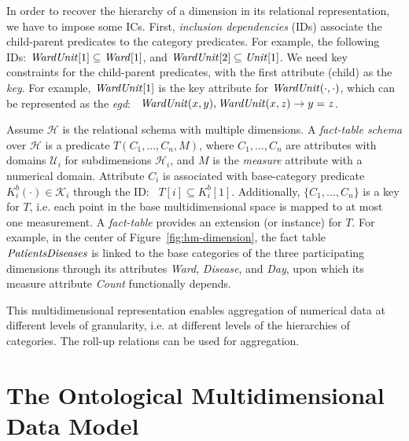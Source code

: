 \documentclass[format=acmsmall, review=false, screen=true]{acmart}
\newcommand{\ignore}[1]{}
\newcommand{\mc}[1]{\mathcal{ #1}}
\newcommand{\nit}[1]{{\it #1}}
\newcommand{\idep}{ID}
\newcommand{\ideps}{IDs}
\newcommand{\egd}{{\em egd}}
\newcommand{\red}[1]{{#1}}
\begin{document}
In order to recover the hierarchy of a dimension in its relational representation, we have to impose some ICs. First, {\em inclusion dependencies} (\ideps) associate the child-parent predicates to the category predicates. For example, the following \ideps:  $\nit{WardUnit}[1] \subseteq \nit{Ward}[1]$, and
$\nit{WardUnit}[2] \subseteq \nit{Unit}[1]$. We need key constraints for the child-parent predicates, with the first attribute (child) as the {\em key}. For example, $\nit{WardUnit}[1]$ is the key attribute for $\nit{WardUnit}(\cdot,\cdot)$, which can be represented as the \egd: \
$\nit{WardUnit}(x,y), \nit{WardUnit}(x,z) \rightarrow y = z$.




\ignore{We can have multiple dimensions reflected with disjoint relational dimensional schemas, one for each dimension. They can be put together into a single multidimensional schema that is the union of the individual ones. In particular, there are now top and base categories predicates in $\mc{K}$, for each dimension. }

Assume $\mc{H}$ is the relational schema with multiple dimensions. A {\em fact-table schema} over $\mc{H}$ is a predicate $T(C_1,...,C_n,M)$, where $C_1,...,C_n$ are attributes with domains $\mc{U}_i$ for subdimensions $\mc{H}_i$, and $M$ is the {\em measure} attribute with a numerical domain. Attribute $C_i$ is associated with base-category predicate $K^b_i(\cdot) \in \mc{K}_i$ through the \idep: \ $T[i] \subseteq K^b_i[1]$. Additionally, $\{C_1,...,C_n\}$ is a key for $T$, i.e. each point in the base multidimensional space is mapped to at most one measurement. A {\em fact-table} provides an extension (or instance) for $T$. For example, \red{in the center of Figure~\ref{fig:hm-dimension}, the fact table $\nit{PatientsDiseases}$ is linked to the base categories of the three participating dimensions through its attributes \nit{Ward}, \nit{Disease}, and \nit{ Day}, upon which its measure attribute \nit{Count} functionally depends.}

This multidimensional representation enables aggregation of numerical data at different levels of granularity, i.e. at different levels of the hierarchies of categories. The roll-up relations can be used for aggregation.






\section{The Ontological Multidimensional  Data Model}\label{sec:omd}
\end{document}

